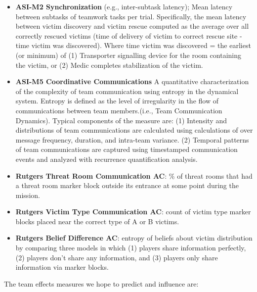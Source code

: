 \begin{itemize}

    \item \textbf{ASI-M2 Synchronization} (e.g., inter-subtask latency);
        Mean latency between subtasks of teamwork tasks per
        trial. Specifically, the mean latency between victim discovery and
        victim rescue computed as the average over all correctly rescued
        victims (time of delivery of victim to correct rescue site - time
        victim was discovered). Where time victim was discovered = the earliest
        (or minimum) of (1) Transporter signalling device for the room
        containing the victim, or (2) Medic completes stabilization of the
        victim.

    \item \textbf{ASI-M5 Coordinative Communications} A quantitative
        characterization of the complexity of team communication using entropy
        in the dynamical system. Entropy is defined as the level of
        irregularity in the flow of communications between team members.(i.e.,
        Team Communication Dynamics).  Typical components of the measure are:
        (1) Intensity and distributions of team communications are calculated
        using calculations of over message frequency, duration, and intra-team
        variance. (2) Temporal patterns of team communications are captured
        using timestamped communication events and analyzed with recurrence
        quantification analysis.

    \item \textbf{Rutgers Threat Room Communication AC}: \% of threat
        rooms that had a threat room marker block outside its entrance at some
        point during the mission.

    \item \textbf{Rutgers Victim Type Communication AC}: count of
        victim type marker blocks placed near the correct type of A or B
        victims.

    \item \textbf{Rutgers Belief Difference AC}: entropy of beliefs about
        victim distribution by comparing three models in which (1) players
        share information perfectly, (2) players don't share any information,
        and (3) players only share information via marker blocks.

\end{itemize}

\noindent The team effects measures we hope to predict and influence are:

